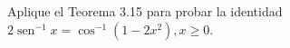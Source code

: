\item Aplique el Teorema 3.15 para probar la identidad $2 \operatorname{sen}^{-1} x = \cos^{-1}(1-2x^2), x \ge 0$.
